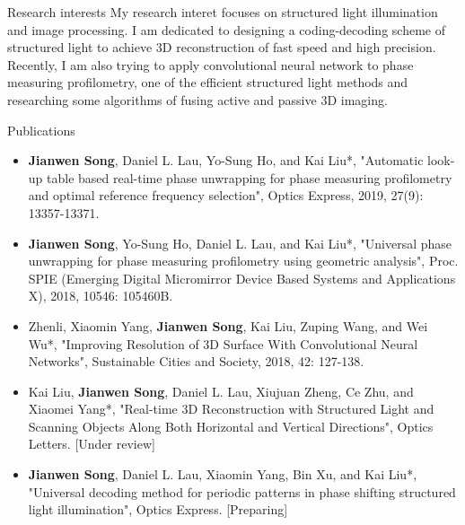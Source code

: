\documentclass{resume} %
\begin{document}
\begin{rSection}{Research interests}
My research interet focuses on structured light illumination and image processing. I am dedicated to designing a coding-decoding scheme of structured light to achieve 3D reconstruction of fast speed and high precision. Recently, I am also trying to apply convolutional neural network to phase measuring profilometry, one of the efficient structured light methods and researching some algorithms of fusing active and passive 3D imaging.
\end{rSection}
\begin{rSection}{Publications}

\begin{itemize}[leftmargin=*]
\item {\bf Jianwen Song}, Daniel L. Lau, Yo-Sung Ho, and Kai Liu*, "Automatic look-up table based real-time phase unwrapping for phase measuring profilometry and optimal reference frequency selection", Optics Express, 2019, 27(9): 13357-13371.
\item {\bf Jianwen Song}, Yo-Sung Ho, Daniel L. Lau, and Kai Liu*, "Universal phase unwrapping for phase measuring profilometry using geometric analysis", Proc. SPIE (Emerging Digital Micromirror Device Based Systems and Applications X), 2018, 10546: 105460B.
\item Zhenli, Xiaomin Yang, {\bf Jianwen Song}, Kai Liu, Zuping Wang, and Wei Wu*, "Improving Resolution of 3D Surface With Convolutional Neural Networks", Sustainable Cities and Society, 2018, 42: 127-138.
\item Kai Liu, {\bf Jianwen Song}, Daniel L. Lau, Xiujuan Zheng, Ce Zhu, and Xiaomei Yang*, "Real-time 3D Reconstruction with Structured Light and Scanning Objects Along Both Horizontal and Vertical Directions", Optics Letters. [Under review]
\item {\bf Jianwen Song}, Daniel L. Lau, Xiaomin Yang, Bin Xu, and Kai Liu*, "Universal decoding method for periodic patterns in phase shifting structured light illumination", Optics Express. [Preparing]
\end{itemize}
\end{rSection}
\end{document}
